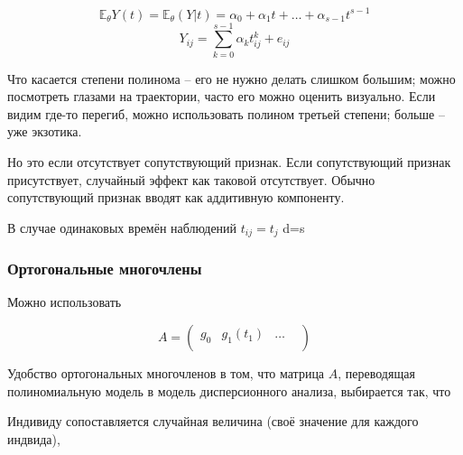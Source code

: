 \documentclass[main.tex]{subfiles}
\begin{document}
\[ \mathds E_\theta Y(t) = \mathds E _\theta (Y|t)=\alpha_0 + \alpha_1 t + \dots + \alpha_{s-1} t^{s-1} \]
\[ Y_{ij} = \sum_{k=0}^{s-1} \alpha_k t_{ij}^{k} + e_{ij} \]

Что касается степени полинома -- его не нужно делать слишком большим; можно посмотреть глазами на траектории, часто его можно оценить визуально.
Если видим где-то перегиб, можно использовать полином третьей степени; больше -- уже экзотика.

Но это если отсутствует сопутствующий признак.
Если сопутствующий признак присутствует, случайный эффект как таковой отсутствует.
Обычно сопутствующий признак вводят как аддитивную компоненту.

В случае одинаковых времён наблюдений $ t_{ij} = t_j $ %
d=s

\subsubsection{Ортогональные многочлены}

Можно использовать

\[ A = \begin{pmatrix}
	g_0 & g_1(t_1) & \dots & \\
\end{pmatrix} \]

Удобство ортогональных многочленов в том, что матрица $ A $, переводящая полиномиальную модель в модель дисперсионного анализа, выбирается так, что 

Индивиду сопоставляется случайная величина (своё значение для каждого индвида),
\end{document}
